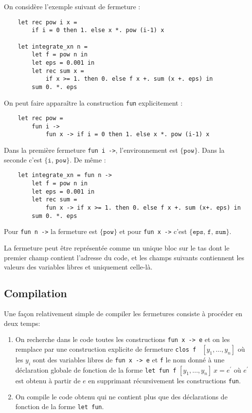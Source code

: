 \documentclass{cours}
\begin{document}
On considère l'exemple suivant de fermeture :
\begin{verbatim}
    let rec pow i x =
        if i = 0 then 1. else x *. pow (i-1) x

    let integrate_xn n =
        let f = pow n in
        let eps = 0.001 in
        let rec sum x =
            if x >= 1. then 0. else f x +. sum (x +. eps) in
        sum 0. *. eps
\end{verbatim}
On peut faire apparaître la construction \texttt{fun} explicitement :
\begin{verbatim}
    let rec pow =
        fun i ->
            fun x -> if i = 0 then 1. else x *. pow (i-1) x
\end{verbatim}

Dans la première fermeture \texttt{fun i ->}, l'environnement est $\{\texttt{pow}\}$. Dans la seconde c'est $\{\texttt{i, pow}\}$. De même :
\begin{verbatim}
    let integrate_xn = fun n ->
        let f = pow n in
        let eps = 0.001 in
        let rec sum =
            fun x -> if x >= 1. then 0. else f x +. sum (x+. eps) in
        sum 0. *. eps
\end{verbatim}
Pour \texttt{fun n ->} la fermeture est $\{\texttt{pow}\}$ et pour \texttt{fun x ->} c'est $\{\texttt{eps, f, sum}\}$.


La fermeture peut être représentée comme un unique bloc sur le tas dont le premier champ contient l'adresse du code, et les champs suivants contiennent les valeurs des variables libres et uniquement celle-là.

\subsection{Compilation}
Une façon relativement simple de compiler les fermetures consiste à procéder en deux temps:
\begin{enumerate}
    \item On recherche dans le code toutes les constructions \texttt{fun x -> e} et on les remplace par une construction explicite de fermeture \texttt{clos f } $[y_{1}, \ldots, y_{n}]$ où les $y_{i}$ sont des variables libres de \texttt{fun x -> e} et \texttt{f} le nom donné à une déclaration globale de fonction de la forme \texttt{let fun f} $[y_{1}, \ldots, y_{n}]\ x = e^{'}$ où $e^{'}$ est obtenu à partir de $e$ en supprimant récursivement les constructions \texttt{fun}.
    \item On compile le code obtenu qui ne contient plus que des déclarations de fonction de la forme \texttt{let fun}.
\end{enumerate}
\end{document}
